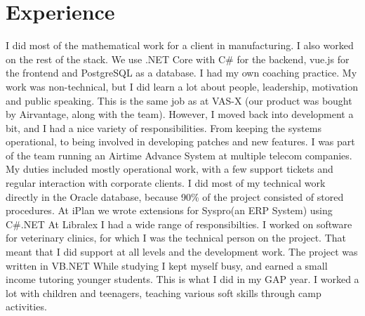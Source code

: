 \documentclass[a4paper]{twentysecondcv} %
\begin{document}

\section{Experience}

\begin{twenty} %
    {I did most of the mathematical work for a client in manufacturing. I also worked on the rest of the stack. We use .NET Core with C\# for the backend, vue.js for the frontend and PostgreSQL as a database.}
    {I had my own coaching practice. My work was non-technical, but I did learn a lot about people, leadership, motivation and public speaking.}
    {This is the same job as at VAS-X (our product was bought by Airvantage, along with the team). However, I moved back into development a bit, and I had a nice variety of responsibilities. From keeping the systems operational, to being involved in developing patches and new features.}
    {I was part of the team running an Airtime Advance System at multiple telecom companies. My duties included mostly operational work, with a few support tickets and regular interaction with corporate clients. I did most of my technical work directly in the Oracle database, because 90\% of the project consisted of stored procedures.}
    {At iPlan we wrote extensions for Syspro(an ERP System) using C\#.NET}
    {At Libralex I had a wide range of responsibilties. I worked on software for veterinary clinics, for which I was the technical person on the project. That meant that I did support at all levels and the development work. The project was written in VB.NET}
    {While studying I kept myself busy, and earned a small income tutoring younger students.}
    {This is what I did in my GAP year. I worked a lot with children and teenagers, teaching various soft skills through camp activities.}
\end{twenty}
\end{document}
